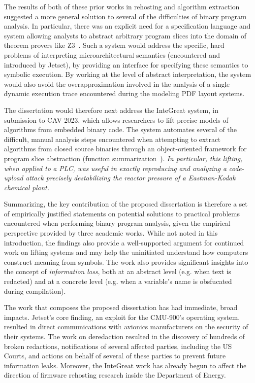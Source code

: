 The results of both of these prior works in rehosting and algorithm extraction suggested a more general solution to several of the difficulties of binary program analysis.
In particular, there was an explicit need for a specification language and system allowing analysts to abstract arbitrary program slices into the domain of theorem provers like Z3~\cite{de2008z3}.
Such a system would address the specific, hard problems of interpreting microarchitectural semantics (encountered and introduced by Jetset), by providing an interface for specifying these semantics to symbolic execution. 
By working at the level of abstract interpretation, the system would also avoid the overapproximation involved in the analysis of a single dynamic execution trace encountered during the modeling PDF layout systems.

The dissertation would therefore next address the InteGreat system, in submission to CAV 2023, which allows researchers to lift precise models of algorithms from embedded binary code.
The system automates several of the difficult, manual analysis steps encountered when attempting to extract algorithms from closed source binaries through an object-oriented framework for program slice abstraction (function summarization~\cite{alt2017hifrog}).
\emph{In particular, this lifting, when applied to a PLC, was useful in exactly reproducing and analyzing a code-upload attack precisely destabilizing the reactor pressure of a Eastman-Kodak chemical plant.}

Summarizing, the key contribution of the proposed dissertation is therefore a set of empirically justified statements on potential solutions to practical problems encountered when performing binary program analysis, given the empirical perspective provided by three academic works.
While not noted in this introduction, the findings also provide a well-supported argument for continued work on lifting systems and may help the uninitiated understand how computers construct meaning from symbols.
The work also provides significant insights into the concept of \emph{information loss}, both at an abstract level (e.g. when text is redacted) and at a concrete level (e.g. when a variable's name is obsfucated during compilation).

The work that composes the proposed dissertation has had immediate, broad impacts.
Jetset's core finding, an exploit for the CMU-900's operating system, resulted in direct communications with avionics manufacturers on the security of their systems.
The work on deredaction resulted in the discovery of hundreds of broken redactions, notifications of several affected parties, including the US Courts, and actions on behalf of several of these parties to prevent future information leaks. 
Moreover, the InteGreat work has already begun to affect the direction of firmware rehosting research inside the Department of Energy.

